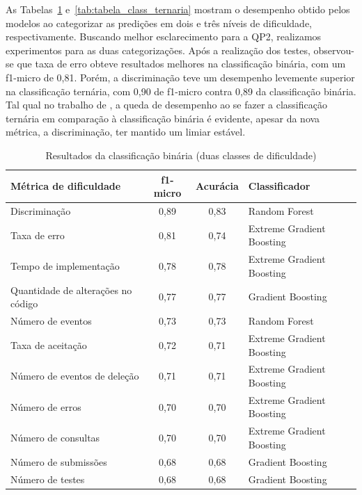 \documentclass[12pt]{article}
\begin{document}
As Tabelas~\ref{tab:tabela_class_binaria} e~\ref{tab:tabela_class_ternaria} mostram o desempenho obtido pelos modelos ao categorizar as predições em dois e três níveis de dificuldade, respectivamente. Buscando melhor esclarecimento para a QP2, realizamos experimentos para as duas categorizações. Após a realização dos testes, observou-se que taxa de erro obteve resultados melhores na classificação binária, com um f1-micro de 0,81. Porém, a discriminação teve um desempenho levemente superior na classificação ternária, com 0,90 de f1-micro contra 0,89 da classificação binária. Tal qual no trabalho de \cite{jackson2023}, a queda de desempenho ao se fazer a classificação ternária em comparação à classificação binária é evidente, apesar da nova métrica, a discriminação, ter mantido um limiar estável.

\begin{table}[h!]
    \centering
    \small
    \caption{Resultados da classificação binária (duas classes de dificuldade)}
    \label{tab:tabela_class_binaria}
    \begin{tabular}{lccl}
        \toprule
        \textbf{Métrica de dificuldade} & \textbf{f1-micro} & \textbf{Acurácia} & \textbf{Classificador} \\
        \midrule
        Discriminação       & 0,89 & 0,83 & Random Forest \\
        Taxa de erro       & 0,81 & 0,74 & Extreme Gradient Boosting \\
        Tempo de implementação & 0,78  & 0,78 & Extreme Gradient Boosting \\
        Quantidade de alterações no código & 0,77 & 0,77   & Gradient Boosting \\
        Número de eventos         & 0,73  & 0,73 & Random Forest \\
        Taxa de aceitação      & 0,72 & 0,71 & Extreme Gradient Boosting \\
        Número de eventos de deleção    & 0,71  & 0,71 & Extreme Gradient Boosting \\
        Número de erros           & 0,70 & 0,70 & Extreme Gradient Boosting \\
        Número de consultas       & 0,70 & 0,70 & Extreme Gradient Boosting \\
        Número de submissões      & 0,68 & 0,68 & Gradient Boosting \\
        Número de testes          & 0,68 & 0,68 & Gradient Boosting \\
        \bottomrule
    \end{tabular}
\end{table}
\end{document}
